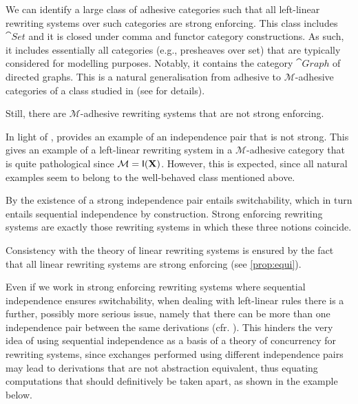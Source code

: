 We can identify a large class of adhesive categories such that all
left-linear rewriting systems over such categories are strong
enforcing. This class includes $\cat{Set}$ and it is closed
under comma and functor category constructions.  As such, it includes
essentially all categories (e.g., presheaves over set) that are
typically considered for modelling purposes. Notably, it contains the
category $\cat{Graph}$ of directed graphs.
This is a natural generalisation from adhesive to $\mathcal{M}$-adhesive categories of a class studied in \cite{baldan2011adhesivity} (see  for details).

Still, there are $\mathcal{M}$-adhesive rewriting systems that are not strong enforcing.

\begin{example}
	\label{ex:diff2}
	In light of ,  provides an example of
	an independence pair that is not strong. This gives an example of a
	left-linear rewriting system in a $\mathcal{M}$-adhesive category that is quite
	pathological since $\mathcal{M}=\mathsf{I(\textbf {\textup{X}})}$. However, this is expected, 
	since all natural examples seem to belong to the well-behaved class mentioned above. 
\end{example}

\begin{remark}
	By  the existence of a strong independence pair
	entails switchability, which in turn entails sequential
	independence by construction. Strong enforcing rewriting systems are exactly
	those rewriting systems in which these three notions coincide.
\end{remark}

Consistency with the theory of linear rewriting systems is ensured by the fact that all linear rewriting systems are strong enforcing (see \cref{prop:equi}).


Even if we work in strong enforcing rewriting systems where sequential
independence ensures switchability, when dealing with left-linear
rules there is a further, possibly more serious issue, 
namely that there can be more than one independence pair between
the same derivations (cfr. ). This hinders the very idea of using
sequential independence as a basis of a theory of concurrency for
rewriting systems, since exchanges performed using different
independence pairs may lead to derivations that are not abstraction
equivalent, thus equating computations that should
definitively be taken apart, as shown in the example below.

